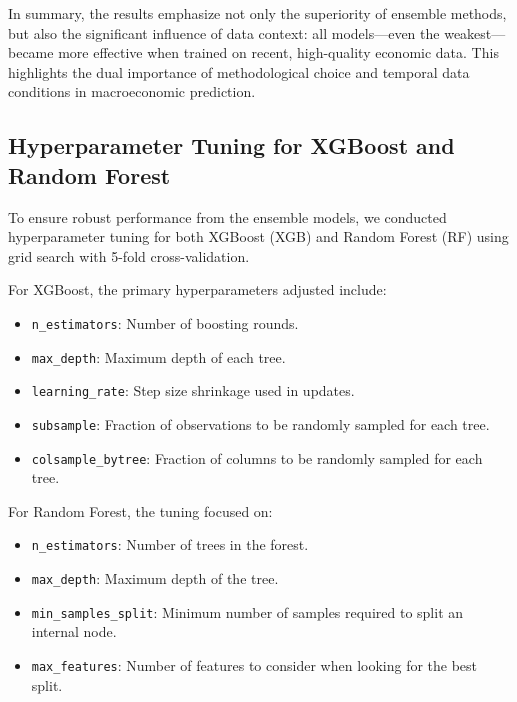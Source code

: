 \documentclass[12pt]{article}
\begin{document}
In summary, the results emphasize not only the superiority of ensemble methods, but also the significant influence of data context: all models—even the weakest—became more effective when trained on recent, high-quality economic data. This highlights the dual importance of methodological choice and temporal data conditions in macroeconomic prediction.

\subsection{Hyperparameter Tuning for XGBoost and Random Forest}

To ensure robust performance from the ensemble models, we conducted hyperparameter tuning for both XGBoost (XGB) and Random Forest (RF) using grid search with 5-fold cross-validation.

For XGBoost, the primary hyperparameters adjusted include:
\begin{itemize}
    \item \texttt{n\_estimators}: Number of boosting rounds.
    \item \texttt{max\_depth}: Maximum depth of each tree.
    \item \texttt{learning\_rate}: Step size shrinkage used in updates.
    \item \texttt{subsample}: Fraction of observations to be randomly sampled for each tree.
    \item \texttt{colsample\_bytree}: Fraction of columns to be randomly sampled for each tree.
\end{itemize}

For Random Forest, the tuning focused on:
\begin{itemize}
    \item \texttt{n\_estimators}: Number of trees in the forest.
    \item \texttt{max\_depth}: Maximum depth of the tree.
    \item \texttt{min\_samples\_split}: Minimum number of samples required to split an internal node.
    \item \texttt{max\_features}: Number of features to consider when looking for the best split.
\end{itemize}
\end{document}
